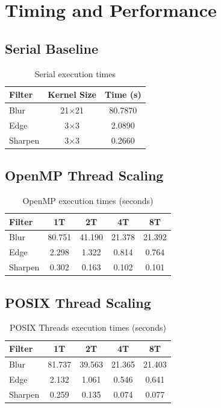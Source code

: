\documentclass[12pt, a4paper]{article}
\begin{document}
\section{Timing and Performance}

\subsection{Serial Baseline}

\begin{table}[H]
\centering
\caption{Serial execution times}
\begin{tabular}{lcc}
\toprule
\textbf{Filter} & \textbf{Kernel Size} & \textbf{Time (s)} \\
\midrule
Blur     & 21$\times$21 & 80.7870 \\
Edge     & 3$\times$3   & 2.0890 \\
Sharpen  & 3$\times$3   & 0.2660 \\
\bottomrule
\end{tabular}
\end{table}

\subsection{OpenMP Thread Scaling}

\begin{table}[H]
\centering
\caption{OpenMP execution times (seconds)}
\begin{tabular}{lcccc}
\toprule
\textbf{Filter} & \textbf{1T} & \textbf{2T} & \textbf{4T} & \textbf{8T} \\
\midrule
Blur    & 80.751 & 41.190 & 21.378 & 21.392 \\
Edge    & 2.298  & 1.322  & 0.814  & 0.764 \\
Sharpen & 0.302  & 0.163  & 0.102  & 0.101 \\
\bottomrule
\end{tabular}
\end{table}

\subsection{POSIX Thread Scaling}

\begin{table}[H]
\centering
\caption{POSIX Threads execution times (seconds)}
\begin{tabular}{lcccc}
\toprule
\textbf{Filter} & \textbf{1T} & \textbf{2T} & \textbf{4T} & \textbf{8T} \\
\midrule
Blur    & 81.737 & 39.563 & 21.365 & 21.403 \\
Edge    & 2.132  & 1.061  & 0.546  & 0.641 \\
Sharpen & 0.259  & 0.135  & 0.074  & 0.077 \\
\bottomrule
\end{tabular}
\end{table}
\end{document}
